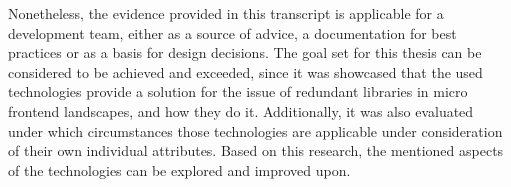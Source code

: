 Nonetheless, the evidence provided in this transcript is applicable for a development team, either as a source of advice, a documentation for best practices or as a basis for design decisions. 
The goal set for this thesis can be considered to be achieved and exceeded, since it was showcased that the used technologies provide a solution for the issue of redundant libraries in micro frontend landscapes, and how they do it. 
Additionally, it was also evaluated under which circumstances those technologies are applicable under consideration of their own individual attributes. 
Based on this research, the mentioned aspects of the technologies can be explored and improved upon.




